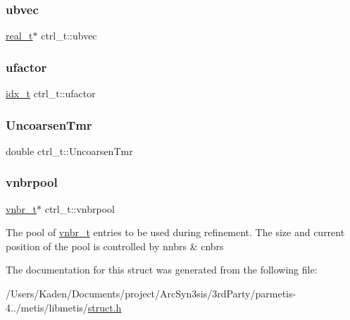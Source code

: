 \subsubsection{\texorpdfstring{ubvec}{ubvec}}
{\footnotesize\ttfamily \hyperlink{a00876_a1924a4f6907cc3833213aba1f07fcbe9}{real\+\_\+t}$\ast$ ctrl\+\_\+t\+::ubvec}

\mbox{\label{a00742_addd3712860b894870748f12557b20d89}} 
\subsubsection{\texorpdfstring{ufactor}{ufactor}}
{\footnotesize\ttfamily \hyperlink{a00876_aaa5262be3e700770163401acb0150f52}{idx\+\_\+t} ctrl\+\_\+t\+::ufactor}

\mbox{\label{a00742_a37132c6afaaed4a8f869d309ba33d1ac}} 
\subsubsection{\texorpdfstring{Uncoarsen\+Tmr}{UncoarsenTmr}}
{\footnotesize\ttfamily double ctrl\+\_\+t\+::\+Uncoarsen\+Tmr}

\mbox{\label{a00742_a1f7258a6dc2780d0f8224293ecff26b7}} 
\subsubsection{\texorpdfstring{vnbrpool}{vnbrpool}}
{\footnotesize\ttfamily \hyperlink{a00722}{vnbr\+\_\+t}$\ast$ ctrl\+\_\+t\+::vnbrpool}

The pool of \hyperlink{a00722}{vnbr\+\_\+t} entries to be used during refinement. The size and current position of the pool is controlled by nnbrs \& cnbrs 

The documentation for this struct was generated from the following file\+:\begin{DoxyCompactItemize}
\item 
/\+Users/\+Kaden/\+Documents/project/\+Arc\+Syn3sis/3rd\+Party/parmetis-\/4../metis/libmetis/\hyperlink{a00972}{struct.\+h}\end{DoxyCompactItemize}
